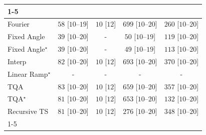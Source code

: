 \begin{tabular}{l|cccc|}
\cline{1-5}
\multicolumn{5}{c}{\rule{0pt}{8pt}SV} \\
\midrule
Fourier & {\cellcolor[HTML]{ECF8E8}} \color[HTML]{000000} $58$ [$10$--$19$] & {\cellcolor[HTML]{F5FBF3}} \color[HTML]{000000} $10$ [$12$] & {\cellcolor[HTML]{00441B}} \color[HTML]{F1F1F1} $699$ [$10$--$20$] & {\cellcolor[HTML]{A3DA9D}} \color[HTML]{000000} $260$ [$10$--$20$] \\
Fixed Angle & {\cellcolor[HTML]{F0F9EC}} \color[HTML]{000000} $39$ [$10$--$20$] & {\cellcolor[HTML]{000000}} \color[HTML]{F1F1F1} {\cellcolor{white}} \color{black} - & {\cellcolor[HTML]{EDF8EA}} \color[HTML]{000000} $50$ [$10$--$19$] & {\cellcolor[HTML]{DBF1D5}} \color[HTML]{000000} $119$ [$10$--$20$] \\
Fixed Angle$^\star$ & {\cellcolor[HTML]{F0F9EC}} \color[HTML]{000000} $39$ [$10$--$20$] & {\cellcolor[HTML]{000000}} \color[HTML]{F1F1F1} {\cellcolor{white}} \color{black} - & {\cellcolor[HTML]{EDF8EA}} \color[HTML]{000000} $49$ [$10$--$19$] & {\cellcolor[HTML]{DCF2D7}} \color[HTML]{000000} $113$ [$10$--$20$] \\
Interp & {\cellcolor[HTML]{E7F6E2}} \color[HTML]{000000} $82$ [$10$--$20$] & {\cellcolor[HTML]{F5FBF3}} \color[HTML]{000000} $10$ [$12$] & {\cellcolor[HTML]{00471C}} \color[HTML]{F1F1F1} $693$ [$10$--$20$] & {\cellcolor[HTML]{68BE70}} \color[HTML]{000000} $370$ [$10$--$20$] \\
Linear Ramp$^\star$ & {\cellcolor[HTML]{000000}} \color[HTML]{F1F1F1} {\cellcolor{white}} \color{black} - & {\cellcolor[HTML]{000000}} \color[HTML]{F1F1F1} {\cellcolor{white}} \color{black} - & {\cellcolor[HTML]{000000}} \color[HTML]{F1F1F1} {\cellcolor{white}} \color{black} - & {\cellcolor[HTML]{000000}} \color[HTML]{F1F1F1} {\cellcolor{white}} \color{black} - \\
TQA & {\cellcolor[HTML]{E6F5E1}} \color[HTML]{000000} $83$ [$10$--$20$] & {\cellcolor[HTML]{F5FBF3}} \color[HTML]{000000} $10$ [$12$] & {\cellcolor[HTML]{005622}} \color[HTML]{F1F1F1} $659$ [$10$--$20$] & {\cellcolor[HTML]{70C274}} \color[HTML]{000000} $357$ [$10$--$20$] \\
TQA$^\star$ & {\cellcolor[HTML]{E7F6E2}} \color[HTML]{000000} $81$ [$10$--$20$] & {\cellcolor[HTML]{F5FBF3}} \color[HTML]{000000} $10$ [$12$] & {\cellcolor[HTML]{005924}} \color[HTML]{F1F1F1} $653$ [$10$--$20$] & {\cellcolor[HTML]{D6EFD0}} \color[HTML]{000000} $132$ [$10$--$20$] \\
Recursive TS & {\cellcolor[HTML]{E7F6E2}} \color[HTML]{000000} $81$ [$10$--$20$] & {\cellcolor[HTML]{F5FBF3}} \color[HTML]{000000} $10$ [$12$] & {\cellcolor[HTML]{9BD696}} \color[HTML]{000000} $276$ [$10$--$20$] & {\cellcolor[HTML]{75C477}} \color[HTML]{000000} $348$ [$10$--$20$] \\
\cline{1-5}
\bottomrule
\end{tabular}
